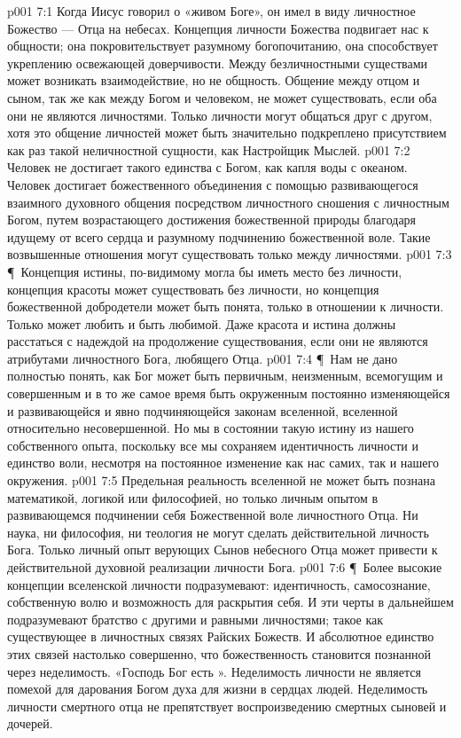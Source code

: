 \vs p001 7:1 Когда Иисус говорил о «живом Боге», он имел в виду личностное Божество --- Отца на небесах. Концепция личности Божества подвигает нас к общности; она покровительствует разумному богопочитанию, она способствует укреплению освежающей доверчивости. Между безличностными существами может возникать взаимодействие, но не общность. Общение между отцом и сыном, так же как между Богом и человеком, не может существовать, если оба они не являются личностями. Только личности могут общаться друг с другом, хотя это общение личностей может быть значительно подкреплено присутствием как раз такой неличностной сущности, как Настройщик Мыслей.
\vs p001 7:2 Человек не достигает такого единства с Богом, как капля воды с океаном. Человек достигает божественного объединения с помощью развивающегося взаимного духовного общения посредством личностного сношения с личностным Богом, путем возрастающего достижения божественной природы благодаря идущему от всего сердца и разумному подчинению божественной воле. Такие возвышенные отношения могут существовать только между личностями.
\vs p001 7:3 \P\ Концепция истины, по\hyp{}видимому могла бы иметь место без личности, концепция красоты может существовать без личности, но концепция божественной добродетели может быть понята, только в отношении к личности. Только  может любить и быть любимой. Даже красота и истина должны расстаться с надеждой на продолжение существования, если они не являются атрибутами личностного Бога, любящего Отца.
\vs p001 7:4 \P\ Нам не дано полностью понять, как Бог может быть первичным, неизменным, всемогущим и совершенным и в то же самое время быть окруженным постоянно изменяющейся и развивающейся и явно подчиняющейся законам вселенной, вселенной относительно несовершенной. Но мы в состоянии  такую истину из нашего собственного опыта, поскольку все мы сохраняем идентичность личности и единство воли, несмотря на постоянное изменение как нас самих, так и нашего окружения.
\vs p001 7:5 Предельная реальность вселенной не может быть познана математикой, логикой или философией, но только личным опытом в развивающемся подчинении себя Божественной воле личностного Отца. Ни наука, ни философия, ни теология не могут сделать действительной личность Бога. Только личный опыт верующих Сынов небесного Отца может привести к действительной духовной реализации личности Бога.
\vs p001 7:6 \P\ Более высокие концепции вселенской личности подразумевают: идентичность, самосознание, собственную волю и возможность для раскрытия себя. И эти черты в дальнейшем подразумевают братство с другими и равными личностями; такое как существующее в личностных связях Райских Божеств. И абсолютное единство этих связей настолько совершенно, что божественность становится познанной через неделимость. «Господь Бог есть  ». Неделимость личности не является помехой для дарования Богом духа для жизни в сердцах людей. Неделимость личности смертного отца не препятствует воспроизведению смертных сыновей и дочерей.

